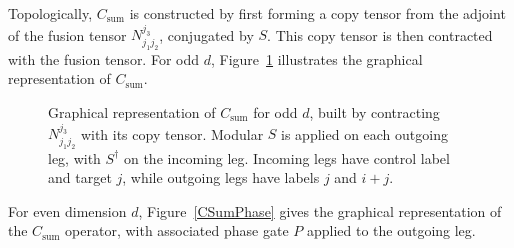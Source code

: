 \documentclass[12pt,a4paper]{article}
\begin{document}
Topologically, $C_{\mathrm{sum}}$ is constructed by first forming a copy tensor from the adjoint of the fusion tensor $N^{j_3}_{j_1 j_2}$, conjugated by $S$. This copy tensor is then contracted with the fusion tensor. For odd $d$, Figure~\ref{CSumGraph} illustrates the graphical representation of $C_{\mathrm{sum}}$.
%
\begin{figure}[h]
\begin{center}
\caption{Graphical representation of $C_{\mathrm{sum}}$ for odd $d$, built by contracting $N^{j_3}_{j_1 j_2}$ with its copy tensor. Modular $S$ is applied on each outgoing leg, with $S^\dagger$ on the incoming leg. Incoming legs have control label and target $j$, while outgoing legs have labels $j$ and $i+j$.}
\label{CSumGraph}
\end{center}
\end{figure}
%
For even dimension $d$, Figure~\ref{CSumPhase} gives the graphical representation of the $C_{\mathrm{sum}}$ operator, with associated phase gate $P$ applied to the outgoing leg.
%
\end{document}
